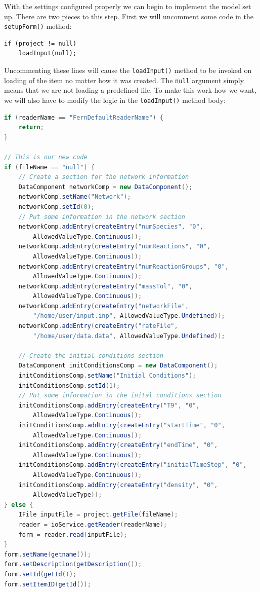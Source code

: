 \documentclass{article} \usepackage{graphicx} \usepackage{hyperref}
\begin{document}
With the settings configured properly we can begin to implement the model set
up.  There are two pieces to this step.  First we will uncomment some code in
the \texttt{setupForm()} method:

\begin{lstlisting}
if (project != null)
    loadInput(null);
\end{lstlisting}

Uncommenting these lines will cause the \texttt{loadInput()} method to be
invoked on loading of the item no matter how it was created.  The \texttt{null}
argument simply means that we are not loading a predefined file.  To make this
work how we want, we will also have to modify the logic in the \texttt{loadInput()} 
method body:

\begin{lstlisting}[language=java]
if (readerName == "FernDefaultReaderName") {
    return;
}

// This is our new code
if (fileName == "null") {
    // Create a section for the network information
    DataComponent networkComp = new DataComponent();
    networkComp.setName("Network");
    networkComp.setId(0);
    // Put some information in the network section
    networkComp.addEntry(createEntry("numSpecies", "0", 
        AllowedValueType.Continuous));
    networkComp.addEntry(createEntry("numReactions", "0", 
        AllowedValueType.Continuous));
    networkComp.addEntry(createEntry("numReactionGroups", "0", 
        AllowedValueType.Continuous));
    networkComp.addEntry(createEntry("massTol", "0", 
        AllowedValueType.Continuous));
    networkComp.addEntry(createEntry("networkFile", 
        "/home/user/input.inp", AllowedValueType.Undefined));
    networkComp.addEntry(createEntry("rateFile", 
        "/home/user/data.data", AllowedValueType.Undefined));

    // Create the initial conditions section
    DataComponent initConditionsComp = new DataComponent();
    initConditionsComp.setName("Initial Conditions");
    initConditionsComp.setId(1);
    // Put some information in the inital conditions section
    initConditionsComp.addEntry(createEntry("T9", "0", 
        AllowedValueType.Continuous));
    initConditionsComp.addEntry(createEntry("startTime", "0", 
        AllowedValueType.Continuous));
    initConditionsComp.addEntry(createEntry("endTime", "0", 
        AllowedValueType.Continuous));
    initConditionsComp.addEntry(createEntry("initialTimeStep", "0", 
        AllowedValueType.Continuous));
    initConditionsComp.addEntry(createEntry("density", "0", 
        AllowedValueType));
} else {
    IFile inputFile = project.getFile(fileName);
    reader = ioService.getReader(readerName);
    form = reader.read(inputFile);
}
form.setName(getname());
form.setDescription(getDescription());
form.setId(getId());
form.setItemID(getId());
\end{lstlisting}
\end{document}
